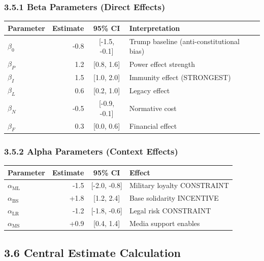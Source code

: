 \documentclass[11pt]{article}
\begin{document}
\subsubsection{3.5.1 Beta Parameters (Direct Effects)}

\begin{table}[h]
\centering
\begin{tabular}{|l|r|c|l|}
\hline
\textbf{Parameter} & \textbf{Estimate} & \textbf{95\% CI} & \textbf{Interpretation} \\
\hline
$\beta_0$ & -0.8 & [-1.5, -0.1] & Trump baseline (anti-constitutional bias) \\
$\beta_P$ & 1.2 & [0.8, 1.6] & Power effect strength \\
$\beta_I$ & 1.5 & [1.0, 2.0] & Immunity effect (STRONGEST) \\
$\beta_L$ & 0.6 & [0.2, 1.0] & Legacy effect \\
$\beta_N$ & -0.5 & [-0.9, -0.1] & Normative cost \\
$\beta_F$ & 0.3 & [0.0, 0.6] & Financial effect \\
\hline
\end{tabular}
\end{table}

\subsubsection{3.5.2 Alpha Parameters (Context Effects)}

\begin{table}[h]
\centering
\begin{tabular}{|l|r|c|l|}
\hline
\textbf{Parameter} & \textbf{Estimate} & \textbf{95\% CI} & \textbf{Effect} \\
\hline
$\alpha_{\text{ML}}$ & -1.5 & [-2.0, -0.8] & Military loyalty CONSTRAINT \\
$\alpha_{\text{BS}}$ & +1.8 & [1.2, 2.4] & Base solidarity INCENTIVE \\
$\alpha_{\text{LR}}$ & -1.2 & [-1.8, -0.6] & Legal risk CONSTRAINT \\
$\alpha_{\text{MS}}$ & +0.9 & [0.4, 1.4] & Media support enables \\
\hline
\end{tabular}
\end{table}

\subsection{3.6 Central Estimate Calculation}
\end{document}
